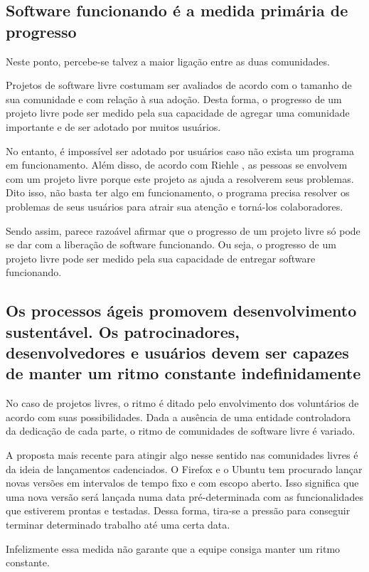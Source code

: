 \subsection{Software funcionando é a medida primária de progresso}

Neste ponto, percebe-se talvez a maior ligação entre as duas
comunidades.

Projetos de software livre costumam ser avaliados de acordo com o
tamanho de sua comunidade e com relação à sua adoção. Desta forma, o
progresso de um projeto livre pode ser medido pela sua capacidade de
agregar uma comunidade importante e de ser adotado por muitos usuários.

No entanto, é impossível ser adotado por usuários caso não exista um
programa em funcionamento. Além disso, de acordo com Riehle
\cite{Riehle2007}, as pessoas se envolvem com um projeto livre porque
este projeto as ajuda a resolverem seus problemas. Dito isso, não
basta ter algo em funcionamento, o programa precisa resolver os
problemas de seus usuários para atrair sua atenção e torná-los
colaboradores.

Sendo assim, parece razoável afirmar que o progresso de um projeto
livre só pode se dar com a liberação de software funcionando. Ou seja,
o progresso de um projeto livre pode ser medido pela sua capacidade de
entregar software funcionando.

\subsection{Os processos ágeis promovem desenvolvimento
  sustentável. Os patrocinadores, desenvolvedores e usuários devem ser
  capazes de manter um ritmo constante indefinidamente}

No caso de projetos livres, o ritmo é ditado pelo envolvimento dos
voluntários de acordo com suas possibilidades. Dada a ausência de uma
entidade controladora da dedicação de cada parte, o ritmo de
comunidades de software livre é variado.

A proposta mais recente para atingir algo nesse sentido nas
comunidades livres é da ideia de lançamentos cadenciados. O Firefox e
o Ubuntu tem procurado lançar novas versões em intervalos de tempo
fixo e com escopo aberto. Isso significa que uma nova versão será
lançada numa data pré-determinada com as funcionalidades que estiverem
prontas e testadas.  Dessa forma, tira-se a pressão para conseguir
terminar determinado trabalho até uma certa data.

Infelizmente essa medida não garante que a equipe consiga manter um
ritmo constante.

